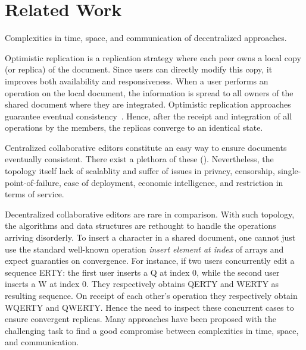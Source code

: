 \section{Related Work}
\label{sec:relatedwork}

\begin{table*}
  \centering
  
  \caption{\label{table:complexities}Complexities in time, space, and communication of decentralized approaches.}
\end{table*}

\begin{asparadesc}
\item[Optimistic replication] is a replication strategy where each peer owns a
  local copy (or replica) of the document. Since users can directly modify this
  copy, it improves both availability and responsiveness. When a user performs
  an operation on the local document, the information is spread to all owners of
  the shared document where they are integrated. Optimistic replication
  approaches guarantee eventual consistency~\cite{bailis2013eventual}. Hence,
  after the receipt and integration of all operations by the members, the
  replicas converge to an identical state.
\item[Centralized] collaborative editors constitute an easy way to ensure
  documents eventually consistent. There exist a plethora of these
  ().  Nevertheless, the topology itself lack of scalablity and
  suffer of issues in privacy, censorship, single-point-of-failure, ease of
  deployment, economic intelligence, and restriction in terms of service.
\item[Decentralized] collaborative editors are rare in comparison. With such
  topology, the algorithms and data structures are rethought to handle the
  operations arriving disorderly.  To insert a character in a shared document,
  one cannot just use the standard well-known operation \emph{insert element at
    index} of arrays and expect guaranties on convergence. For instance, if two
  users concurrently edit a sequence ERTY: the first user inserts a Q at index
  0, while the second user inserts a W at index 0. They respectively obtains
  QERTY and WERTY as resulting sequence. On receipt of each other's operation
  they respectively obtain WQERTY and QWERTY. Hence the need to inspect these
  concurrent cases to ensure convergent replicas.  Many approaches have been
  proposed with the challenging task to find a good compromise between
  complexities in time, space, and communication.

\end{asparadesc}
